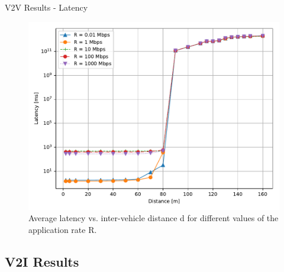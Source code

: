\documentclass{beamer}
\begin{document}
	\begin{frame}{V2V Results - Latency}
		\begin{figure}
			\includegraphics[scale=0.5]{latency_distance_wave_UDP}
			\caption{Average latency vs. inter-vehicle distance d for different values of the application rate R.}
		\end{figure}
	\end{frame}

	\subsection{V2I Results}

\end{document}
